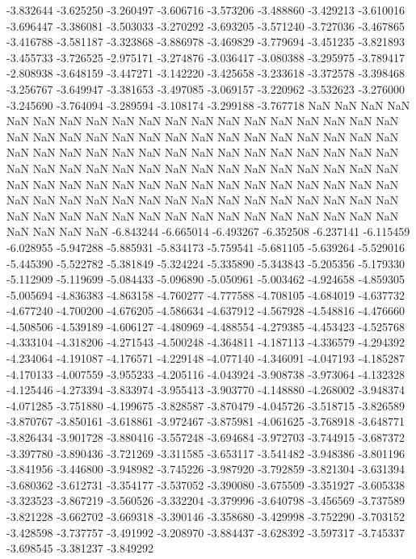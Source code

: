 -3.832644
-3.625250
-3.260497
-3.606716
-3.573206
-3.488860
-3.429213
-3.610016
-3.696447
-3.386081
-3.503033
-3.270292
-3.693205
-3.571240
-3.727036
-3.467865
-3.416788
-3.581187
-3.323868
-3.886978
-3.469829
-3.779694
-3.451235
-3.821893
-3.455733
-3.726525
-2.975171
-3.274876
-3.036417
-3.080388
-3.295975
-3.789417
-2.808938
-3.648159
-3.447271
-3.142220
-3.425658
-3.233618
-3.372578
-3.398468
-3.256767
-3.649947
-3.381653
-3.497085
-3.069157
-3.220962
-3.532623
-3.276000
-3.245690
-3.764094
-3.289594
-3.108174
-3.299188
-3.767718
NaN
NaN
NaN
NaN
NaN
NaN
NaN
NaN
NaN
NaN
NaN
NaN
NaN
NaN
NaN
NaN
NaN
NaN
NaN
NaN
NaN
NaN
NaN
NaN
NaN
NaN
NaN
NaN
NaN
NaN
NaN
NaN
NaN
NaN
NaN
NaN
NaN
NaN
NaN
NaN
NaN
NaN
NaN
NaN
NaN
NaN
NaN
NaN
NaN
NaN
NaN
NaN
NaN
NaN
NaN
NaN
NaN
NaN
NaN
NaN
NaN
NaN
NaN
NaN
NaN
NaN
NaN
NaN
NaN
NaN
NaN
NaN
NaN
NaN
NaN
NaN
NaN
NaN
NaN
NaN
NaN
NaN
NaN
NaN
NaN
NaN
NaN
NaN
NaN
NaN
NaN
NaN
NaN
NaN
NaN
NaN
NaN
NaN
NaN
NaN
NaN
NaN
NaN
NaN
NaN
NaN
NaN
NaN
NaN
NaN
NaN
NaN
NaN
-6.843244
-6.665014
-6.493267
-6.352508
-6.237141
-6.115459
-6.028955
-5.947288
-5.885931
-5.834173
-5.759541
-5.681105
-5.639264
-5.529016
-5.445390
-5.522782
-5.381849
-5.324224
-5.335890
-5.343843
-5.205356
-5.179330
-5.112909
-5.119699
-5.084433
-5.096890
-5.050961
-5.003462
-4.924658
-4.859305
-5.005694
-4.836383
-4.863158
-4.760277
-4.777588
-4.708105
-4.684019
-4.637732
-4.677240
-4.700200
-4.676205
-4.586634
-4.637912
-4.567928
-4.548816
-4.476660
-4.508506
-4.539189
-4.606127
-4.480969
-4.488554
-4.279385
-4.453423
-4.525768
-4.333104
-4.318206
-4.271543
-4.500248
-4.364811
-4.187113
-4.336579
-4.294392
-4.234064
-4.191087
-4.176571
-4.229148
-4.077140
-4.346091
-4.047193
-4.185287
-4.170133
-4.007559
-3.955233
-4.205116
-4.043924
-3.908738
-3.973064
-4.132328
-4.125446
-4.273394
-3.833974
-3.955413
-3.903770
-4.148880
-4.268002
-3.948374
-4.071285
-3.751880
-4.199675
-3.828587
-3.870479
-4.045726
-3.518715
-3.826589
-3.870767
-3.850161
-3.618861
-3.972467
-3.875981
-4.061625
-3.768918
-3.648771
-3.826434
-3.901728
-3.880416
-3.557248
-3.694684
-3.972703
-3.744915
-3.687372
-3.397780
-3.890436
-3.721269
-3.311585
-3.653117
-3.541482
-3.948386
-3.801196
-3.841956
-3.446800
-3.948982
-3.745226
-3.987920
-3.792859
-3.821304
-3.631394
-3.680362
-3.612731
-3.354177
-3.537052
-3.390080
-3.675509
-3.351927
-3.605338
-3.323523
-3.867219
-3.560526
-3.332204
-3.379996
-3.640798
-3.456569
-3.737589
-3.821228
-3.662702
-3.669318
-3.390146
-3.358680
-3.429998
-3.752290
-3.703152
-3.428598
-3.737757
-3.491992
-3.208970
-3.884437
-3.628392
-3.597317
-3.745337
-3.698545
-3.381237
-3.849292
